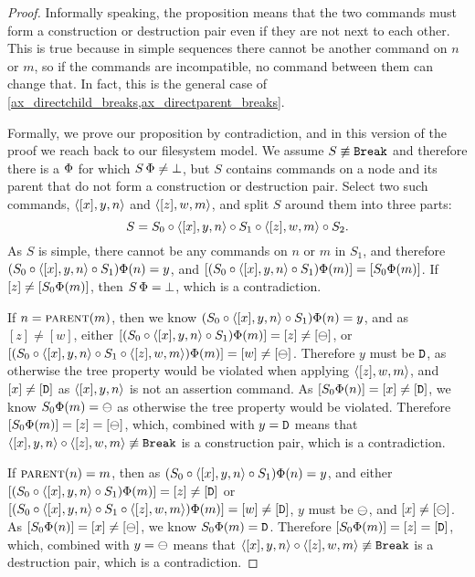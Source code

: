 \begin{proof}
Informally speaking, the proposition means that
the two commands must form a construction or destruction pair even
if they are not next to each other.
This is true because in simple sequences
there cannot be another command on $n$ or $m$,
so if the commands are incompatible, no command between them can change that.
In fact, this  is the general case
of \cref{ax_directchild_breaks,ax_directparent_breaks}.

Formally, we prove our proposition by contradiction,
and in this version of the proof we reach back to our filesystem model.
We assume $S\not\equiv\mathtt{Break}$ and therefore there is a $\Phi$ for which $S\,\Phi\neq\bot$,
but $S$ contains commands on a node and its parent that do not form a construction or destruction pair.
Select two such commands, $\langle{[x],y,n}\rangle$ and $\langle{[z],w,m}\rangle$,
and split $S$ around them into three parts:
\[ S = S_0 \circ \langle{[x],y,n}\rangle \circ S_1 \circ \langle{[z],w,m}\rangle \circ S_2. \]
As $S$ is simple, there cannot be any commands on $n$ or $m$ in $S_1$,
and therefore $(S_0\circ\langle{[x],y,n}\rangle\circ S_1)\Phi(n) = y$,
and $[(S_0\circ\langle{[x],y,n}\rangle\circ S_1)\Phi(m)] = [S_0\Phi(m)]$.
If $[z]\neq[S_0\Phi(m)]$, then $S\,\Phi=\bot$, which is a contradiction.

If $n=\text{\normalfont\scshape{parent}}(m)$, then 
we know $(S_0\circ\langle{[x],y,n}\rangle\circ S_1)\Phi(n) = y$, and as $[z]\neq[w]$, either
$[(S_0\circ\langle{[x],y,n}\rangle\circ S_1)\Phi(m)]=[z]\neq[\ominus]$,
or $[(S_0\circ\langle{[x],y,n}\rangle\circ S_1\circ\langle{[z],w,m}\rangle)\Phi(m)]=[w]\neq[\ominus]$.
Therefore $y$ must be $\mathtt{D}$, as otherwise the tree property would be violated
when applying $\langle{[z],w,m}\rangle$,
and $[x]\neq[\mathtt{D}]$ as $\langle{[x],y,n}\rangle$ is not an assertion command.
As $[S_0\Phi(n)]=[x]\neq[\mathtt{D}]$, we know
$S_0\Phi(m)=\ominus$ as otherwise the tree property would be violated.
Therefore $[S_0\Phi(m)]=[z]=[\ominus]$, which, combined with $y=\mathtt{D}$
means that $\langle{[x],y,n}\rangle\circ\langle{[z],w,m}\rangle\not\equiv\mathtt{Break}$ is a construction pair, which is a contradiction.

If $\text{\normalfont\scshape{parent}}(n)=m$, then 
as $(S_0\circ\langle{[x],y,n}\rangle\circ S_1)\Phi(n) = y$, and either
$[(S_0\circ\langle{[x],y,n}\rangle\circ S_1)\Phi(m)]=[z]\neq[\mathtt{D}]$
or $[(S_0\circ\langle{[x],y,n}\rangle\circ S_1\circ\langle{[z],w,m}\rangle)\Phi(m)]=[w]\neq[\mathtt{D}]$,
$y$ must be $\ominus$, and $[x]\neq[\ominus]$.
As $[S_0\Phi(n)]=[x]\neq[\ominus]$, we know $S_0\Phi(m)=\mathtt{D}$.
Therefore $[S_0\Phi(m)]=[z]=[\mathtt{D}]$, which, combined with $y=\ominus$
means that $\langle{[x],y,n}\rangle\circ\langle{[z],w,m}\rangle\not\equiv\mathtt{Break}$ is a destruction pair, which is a contradiction.
\end{proof}


